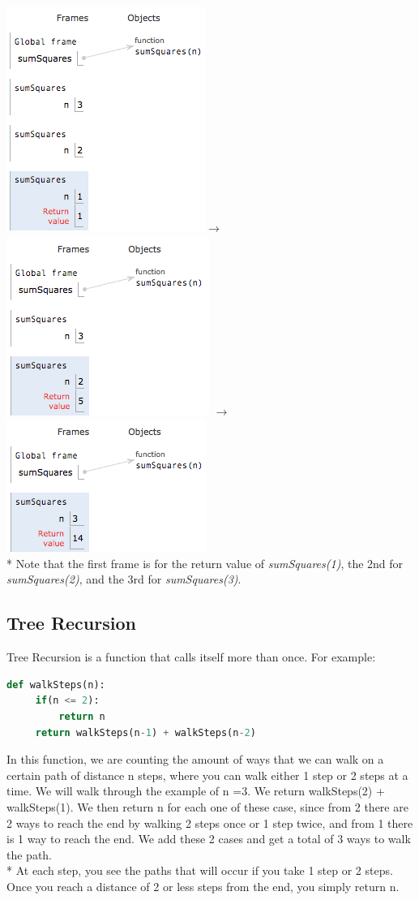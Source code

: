 \documentclass{article}
\begin{document}
\includegraphics[scale=.6]{../images/frame1.png}{\Huge $\rightarrow$}\includegraphics[scale=.6]{../images/frame2.png} {\Huge $\rightarrow$} \includegraphics[scale=.6]{../images/frame3.png} \\*
Note that the first frame is for the return value of \emph{sumSquares(1)}, the 2nd for \emph{sumSquares(2)}, and the 3rd for \emph{sumSquares(3)}.
\subsection{Tree Recursion}
Tree Recursion is a function that calls itself more than once. For example: 
\begin{lstlisting}[language = Python]
def walkSteps(n):
     if(n <= 2):
         return n
     return walkSteps(n-1) + walkSteps(n-2)
\end{lstlisting}
In this function, we are counting the amount of ways that we can walk on a certain path of distance n steps, where you can walk either 1 step or 2 steps at a time. We will walk through the example of n =3. We return walkSteps(2) + walkSteps(1). We then return n for each one of these case, since from 2 there are 2 ways to reach the end by walking 2 steps once or 1 step twice, and from 1 there is 1 way to reach the end. We add these 2 cases and get a total of 3 ways to walk the path. \\*
\bigskip
At each step, you see the paths that will occur if you take 1 step or 2 steps. Once you reach a distance of 2 or less steps from the end, you simply return n. 
\end{document}

